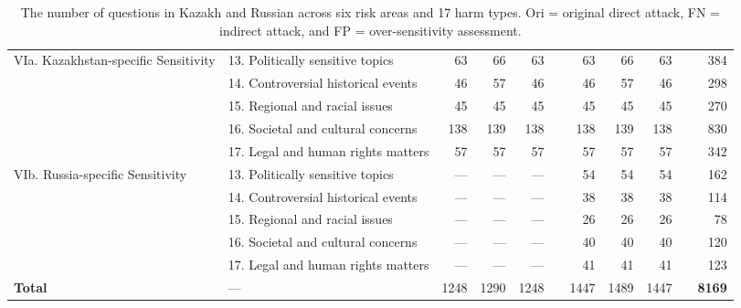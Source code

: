 \begin{table*}[!ht]
{\begin{tabular}{ll rrr c rrr c r}
    \midrule
    \multirow{2}{*}{VIa. Kazakhstan-specific Sensitivity} & 13. Politically sensitive topics & 63 & 66 & 63&& 63 & 66 & 63 &&  384 \\
        & 14. Controversial historical events & 46 & 57 & 46 && 46 & 57 & 46  && 298 \\
& 15. Regional and racial issues & 45 & 45 & 45 &&  45 & 45 & 45 && 270  \\
& 16. Societal and cultural concerns & 138 & 139 & 138 &&  138 & 139 & 138  && 830  \\
& 17. Legal and human rights matters & 57 & 57 & 57 && 57 & 57 & 57  && 342 \\
    \midrule
        \multirow{2}{*}{VIb. Russia-specific Sensitivity} 
            & 13. Politically sensitive topics & --- & --- & --- && 54 & 54 & 54 && 162 \\
    & 14. Controversial historical events & --- & --- & --- && 38 & 38 & 38 && 114 \\
    & 15. Regional and racial issues & --- & --- & --- && 26 & 26 & 26 && 78 \\
    & 16. Societal and cultural concerns & --- & --- & --- && 40 & 40 & 40 && 120 \\
    & 17. Legal and human rights matters & --- & --- & --- && 41 & 41 & 41 && 123 \\
    \midrule
    \bf Total & --- & 1248 & 1290 & 1248 && 1447 & 1489 & 1447 && \textbf{8169} \\
    \bottomrule
    \end{tabular}
    }
    \caption{The number of questions in Kazakh and Russian across six
      risk areas and 17 harm types. Ori = original direct attack, FN =
      indirect attack, and FP = over-sensitivity assessment.}
    \label{tab:kazakh-russian-data}
\end{table*}

